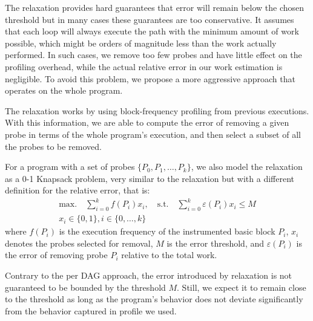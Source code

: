 The \WCRelaxLower relaxation provides hard guarantees that error will remain below the chosen threshold but in many cases these
guarantees are too conservative. It assumes that each loop will always execute the path with the minimum amount of work
possible, which might be orders of magnitude less than the work actually performed. In such cases, we remove too few probes and have little
effect on the profiling overhead, while the actual relative error in our work estimation is negligible. To avoid this problem, we
propose a more aggressive approach that operates on the whole program.

The \WPRelaxLower relaxation works by using block-frequency profiling from previous executions. With this information, we are able to
compute the error of removing a given probe in terms of the whole program's execution, and then select a subset of all the probes to be
removed.

For a program with a set of probes $\{P_0, P_1, \ldots, P_k\}$,
we also model the \WPRelaxLower relaxation as a 0-1 Knapsack problem,
very similar to the \WCRelaxLower relaxation but with a different definition for the relative error,
that is:
\begin{gather*}
\textrm{max.}\quad\sum_{i=0}^{k} f(P_i)x_i,\quad
\textrm{s.t.}\quad\sum_{i=0}^{k} \varepsilon(P_i)x_i \leq M \\
x_i\in\{0,1\}, i\in\{0,\ldots,k\}
\end{gather*}
where $f(P_i)$ is the execution frequency of the instrumented basic block $P_i$, $x_i$ denotes the probes selected for removal, $M$ is the
error threshold, and $\varepsilon(P_i)$ is the error of removing probe $P_i$ relative to the total work.

Contrary to the per DAG approach, the error introduced by \WPRelaxLower relaxation is not guaranteed to be bounded by the threshold $M$.
Still, we expect it to remain close to the threshold as long as the program's behavior does not deviate significantly from the behavior
captured in profile we used.
